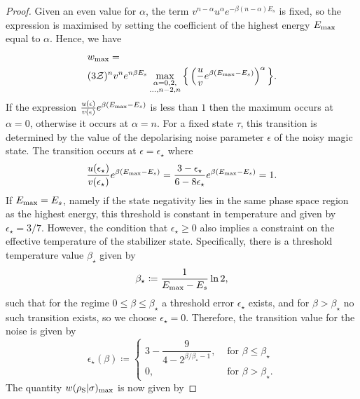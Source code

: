 \documentclass[pra,
aps,
twocolumn,
superscriptaddress,
groupedaddress,
nofootinbib,
reprint
]{revtex4-1}
\begin{document}
\begin{proof}
Given an even value for $\alpha$, the term $v^{n-\alpha} u^{\alpha} e^{-\beta (n-\alpha)E_s}$ is fixed, so the expression is maximised by setting the coefficient of the highest energy $E_{\rm{max}}$ equal to $\alpha$.
Hence, we have
\begin{align}
	&w_{\rm max} = \nonumber\\
	&(3\mathcal{Z})^{n} v^n e^{n\beta E_s}\max\limits_{\substack{\alpha = 0,2, \\ \dots,n-2,n}}{\Big\{ \left( \frac{u}{v} e^{\beta (E_{\rm{max}} - E_s)} \right)^{\alpha} \Big\}}.
\end{align}
If the expression $\frac{u(\epsilon)}{v(\epsilon)} e^{\beta (E_{\rm{max}} - E_s)}$ is less than $1$ then the maximum occurs at $\alpha=0$, otherwise it occurs at $\alpha = n$. For a fixed state $\tau$, this transition is determined by the value of the depolarising noise parameter $\epsilon$ of the noisy magic state. The transition occurs at $\epsilon = \epsilon_\star$ where
\begin{equation}\label{eq:noise_transition}
	\frac{u(\epsilon_\star)}{v(\epsilon_\star)} e^{\beta (E_{\rm{max}} - E_s)} = \frac{3-\epsilon_\star}{6-8\epsilon_\star} e^{\beta (E_{\rm{max}} - E_s)} = 1.
\end{equation}
If $E_{\rm{max}} = E_s$, namely if the state negativity lies in the same phase space region as the highest energy, this threshold is constant in temperature and given by $\epsilon_{\star} = 3/7$. However, the condition that $\epsilon_\star \ge 0$ also implies a constraint on the effective temperature of the stabilizer state. Specifically, there is a threshold temperature value $\beta_\star$ given by
\begin{equation}
	\beta_{\star} \coloneqq \frac{1}{E_{\rm{max}} - E_s} \ln2,
\end{equation}
such that for the regime $0 \leq \beta \leq \beta_\star$ a threshold error $\epsilon_\star$ exists, and for $\beta > \beta_\star$ no such transition exists, so we choose $\epsilon_\star = 0$. 
Therefore, the transition value for the noise is given by
\begin{equation}
	\epsilon_{\star}(\beta) \coloneqq 
	\begin{cases}
		3 - \dfrac{9}{4-2^{\beta/\beta_\star - 1}}, &\text{ for } \beta \leq \beta_\star \\
		0, &\text{ for } \beta > \beta_\star.
	\end{cases}
\end{equation}
The quantity $w(\rho_{\rm{S}} | \sigma)_{\rm{max}}$ is now given by

\end{proof}
\end{document}
